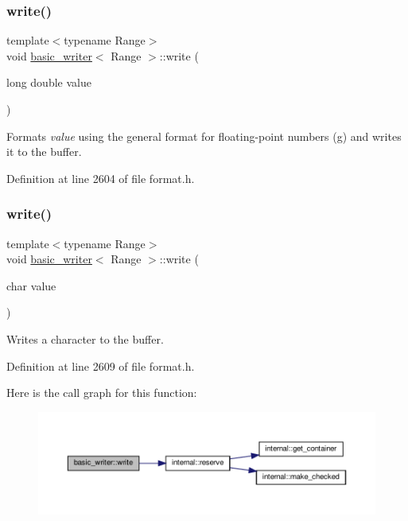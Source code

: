 \subsubsection{\texorpdfstring{write()}{write()}\hspace{0.1cm}{\footnotesize\ttfamily [9/16]}}
{\footnotesize\ttfamily template$<$typename Range$>$ \\
void \hyperlink{classbasic__writer}{basic\+\_\+writer}$<$ Range $>$\+::write (\begin{DoxyParamCaption}\item[{long double}]{value }\end{DoxyParamCaption})\hspace{0.3cm}{\ttfamily [inline]}}

Formats {\itshape value} using the general format for floating-\/point numbers ({\ttfamily \textquotesingle{}g\textquotesingle{}}) and writes it to the buffer.  

Definition at line 2604 of file format.\+h.

\mbox{\label{classbasic__writer_a1046134b869e509059ab496f1f6e9ab9}} 
\subsubsection{\texorpdfstring{write()}{write()}\hspace{0.1cm}{\footnotesize\ttfamily [10/16]}}
{\footnotesize\ttfamily template$<$typename Range$>$ \\
void \hyperlink{classbasic__writer}{basic\+\_\+writer}$<$ Range $>$\+::write (\begin{DoxyParamCaption}\item[{char}]{value }\end{DoxyParamCaption})\hspace{0.3cm}{\ttfamily [inline]}}

Writes a character to the buffer. 

Definition at line 2609 of file format.\+h.

Here is the call graph for this function\+:
\nopagebreak
\begin{figure}[H]
\begin{center}
\leavevmode
\includegraphics[width=350pt]{classbasic__writer_a1046134b869e509059ab496f1f6e9ab9_cgraph}
\end{center}
\end{figure}
\mbox{\label{classbasic__writer_a343bc30c71b3fcd298c0ddd78bf9e8ee}} 
